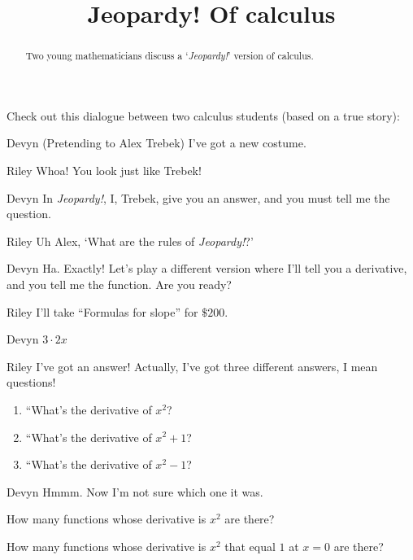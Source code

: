 \documentclass{ximera}
\title[Break-Ground:]{Jeopardy! Of calculus}
\begin{document}
\begin{abstract}
  Two young mathematicians discuss a `\textit{Jeopardy!}' version of calculus.
\end{abstract}
\maketitle

Check out this dialogue between two calculus students (based on a true story):


\begin{dialogue}
\item[Devyn] (Pretending to Alex Trebek) I've got a new costume.
\item[Riley] Whoa! You look just like Trebek!
\item[Devyn] In \textit{Jeopardy!}, I, Trebek, give you an answer, and you must tell me the question.
\item[Riley] Uh Alex, `What are the rules of \textit{Jeopardy!}?'
\item[Devyn] Ha. Exactly! Let's play a different version where I'll
  tell you a derivative, and you tell me the function.  Are you ready?
\item[Riley] I'll take ``Formulas for slope'' for $\$200$.
\item[Devyn] $3\cdot 2x$  
\item[Riley] I've got an answer!  Actually, I've got three different
  answers, I mean questions!
  \begin{enumerate}
  \item ``What's the derivative of $x^2$?
  \item ``What's the derivative of $x^2+1$?
  \item ``What's the derivative of $x^2-1$?
  \end{enumerate}
\item[Devyn] Hmmm. Now I'm not sure which one it was.
\end{dialogue}


\begin{problem}
  How many functions whose derivative is $x^2$ are there?
  \begin{multipleChoice}
  \end{multipleChoice}
\end{problem}

\begin{problem}
  How many functions whose derivative is $x^2$ that equal
  $1$ at $x=0$ are there?
  \begin{multipleChoice}
  \end{multipleChoice}
\end{problem}



\end{document}
